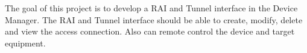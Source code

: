 The goal of this project is to develop a RAI and Tunnel interface in the Device Manager.
The RAI and Tunnel interface should be able to create, modify, delete and view the access connection.
Also can remote control the device and target equipment.